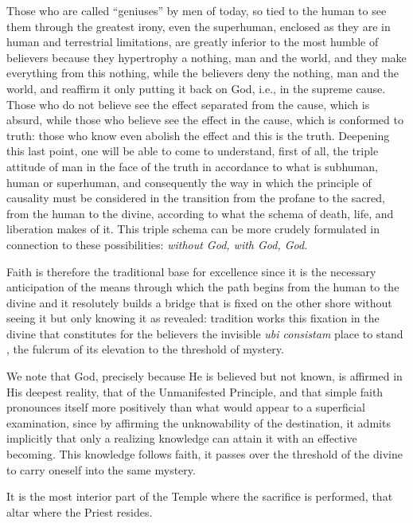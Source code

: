 Those who are called ``geniuses'' by men of today, so tied to the human to see them through the greatest irony, even the superhuman, enclosed as they are in human and terrestrial limitations, are greatly inferior to the most humble of believers because they hypertrophy a nothing, man and the world, and they make everything from this nothing, while the believers deny the nothing, man and the world, and reaffirm it only putting it back on God, i.e., in the supreme cause. Those who do not believe see the effect separated from the cause, which is absurd, while those who believe see the effect in the cause, which is conformed to truth: those who know even abolish the effect and this is the truth. Deepening this last point, one will be able to come to understand, first of all, the triple attitude of man in the face of the truth in accordance to what is subhuman, human or superhuman, and consequently the way in which the principle of causality must be considered in the transition from the profane to the sacred, from the human to the divine, according to what the schema of death, life, and liberation makes of it. This triple schema can be more crudely formulated in connection to these possibilities: \emph{without God, with God, God}.

Faith is therefore the traditional base for excellence since it is the necessary anticipation of the means through which the path begins from the human to the divine and it resolutely builds a bridge that is fixed on the other shore without seeing it but only knowing it as revealed: tradition works this fixation in the divine that constitutes for the believers the invisible \emph{ubi consistam} place to stand , the fulcrum of its elevation to the threshold of mystery.

We note that God, precisely because He is believed but not known, is affirmed in His deepest reality, that of the Unmanifested Principle, and that simple faith pronounces itself more positively than what would appear to a superficial examination, since by affirming the unknowability of the destination, it admits implicitly that only a realizing knowledge can attain it with an effective becoming. This knowledge follows faith, it passes over the threshold of the divine to carry oneself into the same mystery.

It is the most interior part of the Temple where the sacrifice is performed, that altar where the Priest resides.

